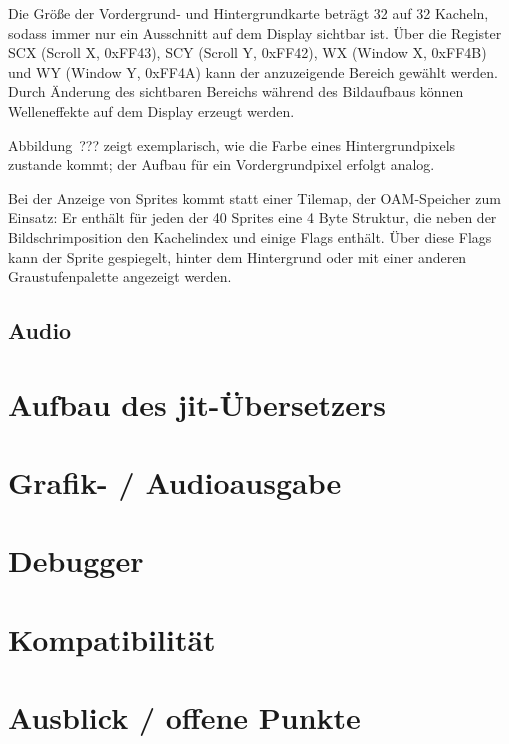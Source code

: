 \documentclass[a4paper]{scrartcl}
\begin{document}
Die Größe der Vordergrund- und Hintergrundkarte beträgt 32 auf 32 Kacheln, sodass immer nur ein Ausschnitt auf dem Display sichtbar ist. Über die Register SCX (Scroll X, 0xFF43), SCY (Scroll Y, 0xFF42), WX (Window X, 0xFF4B) und WY (Window Y, 0xFF4A) kann der anzuzeigende Bereich gewählt werden. Durch Änderung des sichtbaren Bereichs während des Bildaufbaus können Welleneffekte auf dem Display erzeugt werden.

Abbildung~??? zeigt exemplarisch, wie die Farbe eines Hintergrundpixels zustande kommt; der Aufbau für ein Vordergrundpixel erfolgt analog.

Bei der Anzeige von Sprites kommt statt einer Tilemap, der OAM-Speicher zum Einsatz: Er enthält für jeden der 40 Sprites eine 4 Byte Struktur, die neben der Bildschrimposition den Kachelindex und einige Flags enthält. Über diese Flags kann der Sprite gespiegelt, hinter dem Hintergrund oder mit einer anderen Graustufenpalette angezeigt werden.
\subsection{Audio}
\section{Aufbau des jit-Übersetzers}
\section{Grafik- / Audioausgabe}
\section{Debugger}
\section{Kompatibilität}
\section{Ausblick / offene Punkte}
\end{document}
